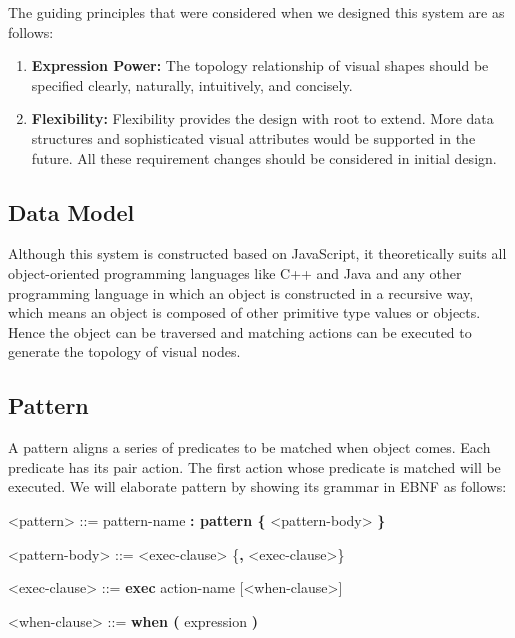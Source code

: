 The guiding principles that were considered when we designed this system are as follows:
\begin {enumerate}
\item \textbf {Expression Power:} The topology relationship of visual shapes should be specified clearly, naturally, intuitively, and concisely.
\item \textbf {Flexibility:} Flexibility provides the design with root to extend. More data structures and sophisticated visual attributes would be supported in the future. All these requirement changes should be considered in initial design. 
\end {enumerate}

\subsection {Data Model}
Although this system is constructed based on JavaScript, it theoretically suits all object-oriented programming languages like C++ and Java and any other programming language in which an object is constructed in a recursive way, which means an object is composed of other primitive type values or objects. Hence the object can be traversed and matching actions can be executed to generate the topology of visual nodes.

\subsection {Pattern}
A pattern aligns a series of predicates to be matched when object comes. Each predicate has its pair action. The first action whose predicate is matched will be executed. We will elaborate pattern by showing its grammar in EBNF as follows:

\begin{center}
  \begin{minipage}{0.8\linewidth}
    \begin{grammar}
      <pattern> ::= pattern-name \textbf{: pattern \{} <pattern-body> \textbf{\}}

      <pattern-body> ::= <exec-clause> \{\textbf{,} <exec-clause>\}

      <exec-clause> ::= \textbf{exec} action-name [<when-clause>]

      <when-clause> ::= \textbf{when (} expression \textbf{)}
    \end{grammar}
  \end{minipage}
\end{center}

